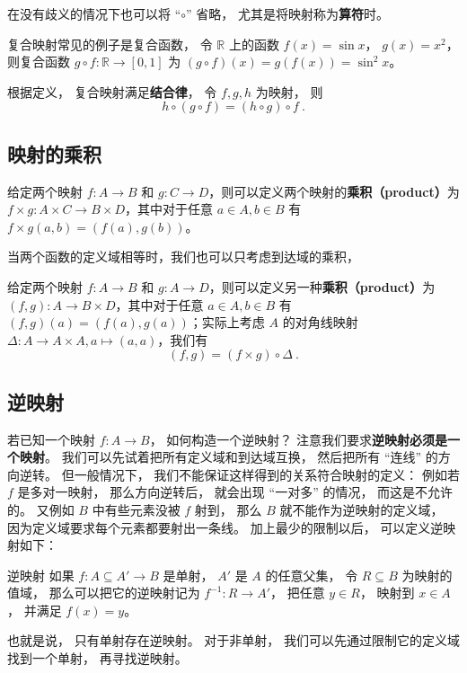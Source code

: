 在没有歧义的情况下也可以将 “$\circ$” 省略， 尤其是将映射称为\textbf{算符}时。

复合映射常见的例子是复合函数， 令 $\mathbb R$ 上的函数 $f(x) = \sin x$， $g(x) = x^2$， 则复合函数 $g\circ f: \mathbb R \to [0, 1]$ 为 $(g\circ f)(x) = g(f(x)) = \sin^2 x$。

根据定义， 复合映射满足\textbf{结合律}， 令 $f, g, h$ 为映射， 则
\begin{equation}
h \circ (g \circ f) = (h \circ g) \circ f~.
\end{equation}

\subsection{映射的乘积}

\begin{definition}{}
给定两个映射 $f: A \to B$ 和 $g: C \to D$，则可以定义两个映射的\textbf{乘积（product）}为 $f\times g: A \times C \to B\times D$，其中对于任意 $a\in A, b\in B$ 有 $f\times g(a, b)=(f(a), g(b))$。
\end{definition}

当两个函数的定义域相等时，我们也可以只考虑到达域的乘积，

\begin{definition}{}\label{def_map_2}
给定两个映射 $f: A \to B$ 和 $g: A \to D$，则可以定义另一种\textbf{乘积（product）}为 $(f, g): A \to B\times D$，其中对于任意 $a\in A, b\in B$ 有 $(f, g)(a)=(f(a), g(a))$；实际上考虑 $A$ 的对角线映射$\Delta: A \to A \times A, a \mapsto (a, a)$，我们有
\begin{equation}
(f, g) = (f \times g) \circ \Delta~.
\end{equation}
\end{definition}

\subsection{逆映射}
若已知一个映射 $f: A\to B$， 如何构造一个逆映射？ 注意我们要求\textbf{逆映射必须是一个映射}。 我们可以先试着把所有定义域和到达域互换， 然后把所有 “连线” 的方向逆转。 但一般情况下， 我们不能保证这样得到的关系符合映射的定义： 例如若 $f$ 是多对一映射， 那么方向逆转后， 就会出现 “一对多” 的情况， 而这是不允许的。 又例如 $B$ 中有些元素没被 $f$ 射到， 那么 $B$ 就不能作为逆映射的定义域， 因为定义域要求每个元素都要射出一条线。 加上最少的限制以后， 可以定义逆映射如下：

\begin{definition}{逆映射}
如果 $f: A\subseteq A' \to B$ 是单射， $A'$ 是 $A$ 的任意父集， 令 $R \subseteq B$ 为映射的值域， 那么可以把它的逆映射记为 $f^{-1}: R \to A'$， 把任意 $y \in R$， 映射到 $x \in A$， 并满足 $f(x) = y$。
\end{definition}
也就是说， 只有单射存在逆映射。 对于非单射， 我们可以先通过限制它的定义域找到一个单射， 再寻找逆映射。

